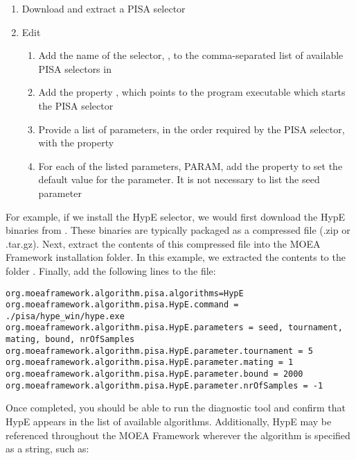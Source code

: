 \begin{enumerate}
  \item Download and extract a PISA selector
  \item Edit 
    \begin{enumerate}
      \item Add the name of the selector, , to the comma-separated list of available PISA selectors in 
      \item Add the property , which points to the program executable which starts the PISA selector
      \item Provide a list of parameters, in the order required by the PISA selector, with the property 
      \item For each of the listed parameters, PARAM, add the property  to set the default value for the parameter.  It is not necessary to list the seed parameter
    \end{enumerate}
\end{enumerate}

For example, if we install the HypE selector, we would first download the HypE binaries from .  These binaries are typically packaged as a compressed file (.zip or .tar.gz).  Next, extract the contents of this compressed file into the MOEA Framework installation folder.  In this example, we extracted the contents to the folder .  Finally, add the following lines to the  file:

\begin{lstlisting}[language=Plaintext]
org.moeaframework.algorithm.pisa.algorithms=HypE
org.moeaframework.algorithm.pisa.HypE.command = ./pisa/hype_win/hype.exe
org.moeaframework.algorithm.pisa.HypE.parameters = seed, tournament, mating, bound, nrOfSamples
org.moeaframework.algorithm.pisa.HypE.parameter.tournament = 5
org.moeaframework.algorithm.pisa.HypE.parameter.mating = 1
org.moeaframework.algorithm.pisa.HypE.parameter.bound = 2000
org.moeaframework.algorithm.pisa.HypE.parameter.nrOfSamples = -1
\end{lstlisting}

Once completed, you should be able to run the diagnostic tool and confirm that HypE appears in the list of available algorithms.  Additionally, HypE may be referenced throughout the MOEA Framework wherever the algorithm is specified as a string, such as:

